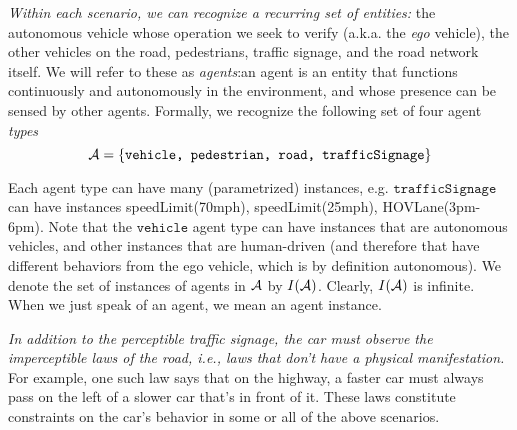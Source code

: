 {\it Within each scenario, we can recognize a recurring set of entities: }
the autonomous vehicle whose operation we seek to verify (a.k.a. the \emph{ego} vehicle), the other vehicles on the road, pedestrians, traffic signage, and the road network itself. 
We will refer to these as \emph{agents}:an agent is an entity that functions continuously and autonomously in the environment, and whose presence can be sensed by other agents. 
Formally, we recognize the following set of four agent \emph{types}
\[\mathcal{A} = \{\texttt{vehicle, pedestrian, road, trafficSignage}\}\]

Each agent type can have many (parametrized) instances, e.g. $\texttt{trafficSignage}$ can have instances speedLimit(70mph), speedLimit(25mph), HOVLane(3pm-6pm).
Note that the $\texttt{vehicle}$ agent type can have instances that are autonomous vehicles, and other instances that are human-driven (and therefore that have different behaviors from the ego vehicle, which is by definition autonomous). 
We denote the set of instances of agents in $\mathcal{A}$ by $I(\mathcal{A})$.
Clearly, $I(\mathcal{A})$ is infinite.
When we just speak of an agent, we mean an agent instance.

{\it In addition to the perceptible traffic signage, the car must observe the imperceptible laws of the road, i.e., laws that don't have a physical manifestation. }
For example, one such law says that on the highway, a faster car must always pass on the left of a slower car that's in front of it.
These laws constitute constraints on the car's behavior in some or all of the above scenarios.

